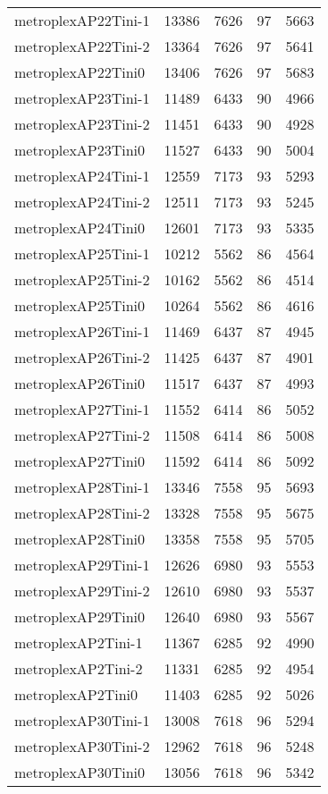 \begin{longtable}{lrrrr}
metroplexAP22Tini-1 & 13386 & 7626 & 97 & 5663 \\
metroplexAP22Tini-2 & 13364 & 7626 & 97 & 5641 \\
metroplexAP22Tini0 & 13406 & 7626 & 97 & 5683 \\
metroplexAP23Tini-1 & 11489 & 6433 & 90 & 4966 \\
metroplexAP23Tini-2 & 11451 & 6433 & 90 & 4928 \\
metroplexAP23Tini0 & 11527 & 6433 & 90 & 5004 \\
metroplexAP24Tini-1 & 12559 & 7173 & 93 & 5293 \\
metroplexAP24Tini-2 & 12511 & 7173 & 93 & 5245 \\
metroplexAP24Tini0 & 12601 & 7173 & 93 & 5335 \\
metroplexAP25Tini-1 & 10212 & 5562 & 86 & 4564 \\
metroplexAP25Tini-2 & 10162 & 5562 & 86 & 4514 \\
metroplexAP25Tini0 & 10264 & 5562 & 86 & 4616 \\
metroplexAP26Tini-1 & 11469 & 6437 & 87 & 4945 \\
metroplexAP26Tini-2 & 11425 & 6437 & 87 & 4901 \\
metroplexAP26Tini0 & 11517 & 6437 & 87 & 4993 \\
metroplexAP27Tini-1 & 11552 & 6414 & 86 & 5052 \\
metroplexAP27Tini-2 & 11508 & 6414 & 86 & 5008 \\
metroplexAP27Tini0 & 11592 & 6414 & 86 & 5092 \\
metroplexAP28Tini-1 & 13346 & 7558 & 95 & 5693 \\
metroplexAP28Tini-2 & 13328 & 7558 & 95 & 5675 \\
metroplexAP28Tini0 & 13358 & 7558 & 95 & 5705 \\
metroplexAP29Tini-1 & 12626 & 6980 & 93 & 5553 \\
metroplexAP29Tini-2 & 12610 & 6980 & 93 & 5537 \\
metroplexAP29Tini0 & 12640 & 6980 & 93 & 5567 \\
metroplexAP2Tini-1 & 11367 & 6285 & 92 & 4990 \\
metroplexAP2Tini-2 & 11331 & 6285 & 92 & 4954 \\
metroplexAP2Tini0 & 11403 & 6285 & 92 & 5026 \\
metroplexAP30Tini-1 & 13008 & 7618 & 96 & 5294 \\
metroplexAP30Tini-2 & 12962 & 7618 & 96 & 5248 \\
metroplexAP30Tini0 & 13056 & 7618 & 96 & 5342 \\

\end{longtable}
